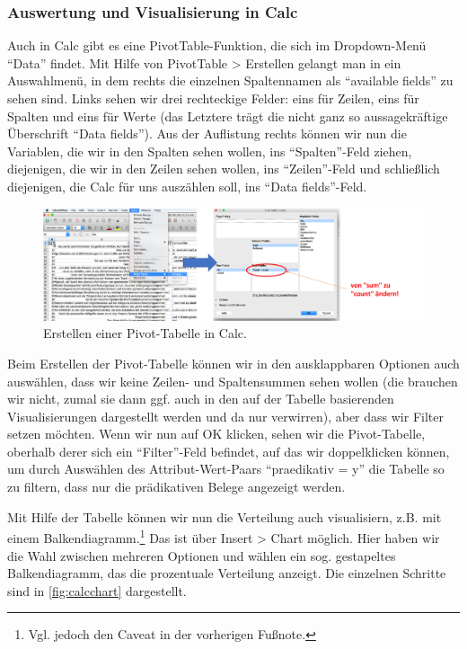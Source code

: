 \documentclass[]{article}
\let\rmarkdownfootnote\footnote%
\def\footnote{\protect\rmarkdownfootnote}
\begin{document}
\subsubsection{Auswertung und Visualisierung in
Calc}\label{auswertung-und-visualisierung-in-calc}

Auch in Calc gibt es eine PivotTable-Funktion, die sich im Dropdown-Menü
``Data'' findet. Mit Hilfe von PivotTable \textgreater{} Erstellen
gelangt man in ein Auswahlmenü, in dem rechts die einzelnen Spaltennamen
als ``available fields'' zu sehen sind. Links sehen wir drei rechteckige
Felder: eins für Zeilen, eins für Spalten und eins für Werte (das
Letztere trägt die nicht ganz so aussagekräftige Überschrift ``Data
fields''). Aus der Auflistung rechts können wir nun die Variablen, die
wir in den Spalten sehen wollen, ins ``Spalten''-Feld ziehen,
diejenigen, die wir in den Zeilen sehen wollen, ins ``Zeilen''-Feld und
schließlich diejenigen, die Calc für uns auszählen soll, ins ``Data
fields''-Feld.

\begin{figure}
\includegraphics[width=6.66in]{docs/fig/calc_pivot} \caption{Erstellen einer Pivot-Tabelle in Calc.}\label{fig:calcpivot}
\end{figure}

Beim Erstellen der Pivot-Tabelle können wir in den ausklappbaren
Optionen auch auswählen, dass wir keine Zeilen- und Spaltensummen sehen
wollen (die brauchen wir nicht, zumal sie dann ggf. auch in den auf der
Tabelle basierenden Visualisierungen dargestellt werden und da nur
verwirren), aber dass wir Filter setzen möchten. Wenn wir nun auf OK
klicken, sehen wir die Pivot-Tabelle, oberhalb derer sich ein
``Filter''-Feld befindet, auf das wir doppelklicken können, um durch
Auswählen des Attribut-Wert-Paars ``praedikativ = y'' die Tabelle so zu
filtern, dass nur die prädikativen Belege angezeigt werden.

Mit Hilfe der Tabelle können wir nun die Verteilung auch visualisiern,
z.B. mit einem Balkendiagramm.\footnote{Vgl. jedoch den Caveat in der
  vorherigen Fußnote.} Das ist über Insert \textgreater{} Chart möglich.
Hier haben wir die Wahl zwischen mehreren Optionen und wählen ein sog.
gestapeltes Balkendiagramm, das die prozentuale Verteilung anzeigt. Die
einzelnen Schritte sind in \ref{fig:calcchart} dargestellt.
\end{document}

